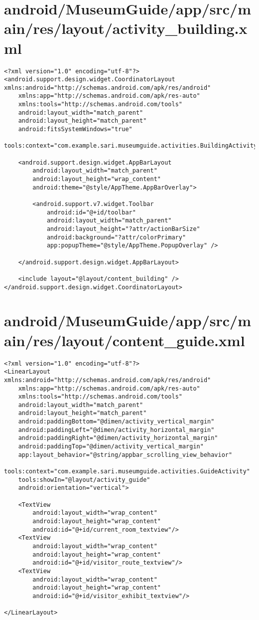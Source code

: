 \section{android/MuseumGuide/app/src/main/res/layout/activity_building.xml}
\begin{lstlisting}<?xml version="1.0" encoding="utf-8"?>
<android.support.design.widget.CoordinatorLayout xmlns:android="http://schemas.android.com/apk/res/android"
    xmlns:app="http://schemas.android.com/apk/res-auto"
    xmlns:tools="http://schemas.android.com/tools"
    android:layout_width="match_parent"
    android:layout_height="match_parent"
    android:fitsSystemWindows="true"
    tools:context="com.example.sari.museumguide.activities.BuildingActivity">

    <android.support.design.widget.AppBarLayout
        android:layout_width="match_parent"
        android:layout_height="wrap_content"
        android:theme="@style/AppTheme.AppBarOverlay">

        <android.support.v7.widget.Toolbar
            android:id="@+id/toolbar"
            android:layout_width="match_parent"
            android:layout_height="?attr/actionBarSize"
            android:background="?attr/colorPrimary"
            app:popupTheme="@style/AppTheme.PopupOverlay" />

    </android.support.design.widget.AppBarLayout>

    <include layout="@layout/content_building" />
</android.support.design.widget.CoordinatorLayout>
\end{lstlisting}
\newpage
\section{android/MuseumGuide/app/src/main/res/layout/content_guide.xml}
\begin{lstlisting}<?xml version="1.0" encoding="utf-8"?>
<LinearLayout xmlns:android="http://schemas.android.com/apk/res/android"
    xmlns:app="http://schemas.android.com/apk/res-auto"
    xmlns:tools="http://schemas.android.com/tools"
    android:layout_width="match_parent"
    android:layout_height="match_parent"
    android:paddingBottom="@dimen/activity_vertical_margin"
    android:paddingLeft="@dimen/activity_horizontal_margin"
    android:paddingRight="@dimen/activity_horizontal_margin"
    android:paddingTop="@dimen/activity_vertical_margin"
    app:layout_behavior="@string/appbar_scrolling_view_behavior"
    tools:context="com.example.sari.museumguide.activities.GuideActivity"
    tools:showIn="@layout/activity_guide"
    android:orientation="vertical">

    <TextView
        android:layout_width="wrap_content"
        android:layout_height="wrap_content"
        android:id="@+id/current_room_textview"/>
    <TextView
        android:layout_width="wrap_content"
        android:layout_height="wrap_content"
        android:id="@+id/visitor_route_textview"/>
    <TextView
        android:layout_width="wrap_content"
        android:layout_height="wrap_content"
        android:id="@+id/visitor_exhibit_textview"/>

</LinearLayout>
\end{lstlisting}
\newpage
